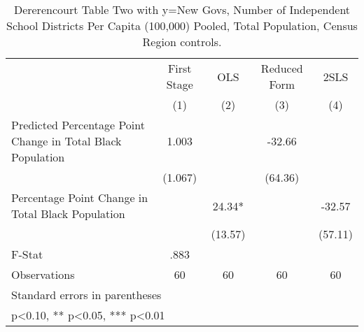 \begin{table}[htbp]\centering
\def\sym#1{\ifmmode^{#1}\else\(^{#1}\)\fi}
\caption{Dererencourt Table Two with y=New Govs, Number of Independent School Districts Per Capita (100,000) Pooled, Total Population, Census Region controls.}
\begin{tabular}{l*{4}{c}}
\toprule
                    & First Stage   &         OLS   &Reduced Form   &        2SLS   \\
                    &\multicolumn{1}{c}{(1)}   &\multicolumn{1}{c}{(2)}   &\multicolumn{1}{c}{(3)}   &\multicolumn{1}{c}{(4)}   \\
\midrule
Predicted Percentage Point Change in Total Black Population&       1.003   &               &      -32.66   &               \\
                    &     (1.067)   &               &     (64.36)   &               \\
\addlinespace
Percentage Point Change in Total Black Population&               &       24.34*  &               &      -32.57   \\
                    &               &     (13.57)   &               &     (57.11)   \\
\midrule
F-Stat              &        .883   &               &               &               \\
Observations        &          60   &          60   &          60   &          60   \\
\bottomrule
\multicolumn{5}{l}{\footnotesize Standard errors in parentheses}\\
\multicolumn{5}{l}{\footnotesize * p<0.10, ** p<0.05, *** p<0.01}\\
\end{tabular}
\end{table}

